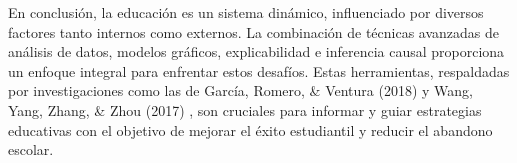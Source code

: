 En conclusión, la educación es un sistema dinámico, influenciado por diversos factores tanto internos como externos. La combinación de técnicas avanzadas de análisis de datos, modelos gráficos, explicabilidad e inferencia causal proporciona un enfoque integral para enfrentar estos desafíos. Estas herramientas, respaldadas por investigaciones como las de García, Romero, \& Ventura (2018) \cite{garcia2018prediccion} y Wang, Yang, Zhang, \& Zhou (2017) \cite{wang2017literature}, son cruciales para informar y guiar estrategias educativas con el objetivo de mejorar el éxito estudiantil y reducir el abandono escolar.
